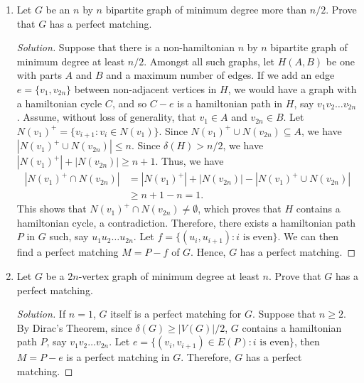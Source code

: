 \documentclass{article}
\newenvironment{problem}[2][Question]{\begin{trivlist}
\item[\hskip \labelsep {\bfseries #1}\hskip \labelsep {\bfseries #2.}]}{\end{trivlist}}
\begin{document}
\begin{problem}{3.8.8}
    
\end{problem}
\begin{enumerate}[label=(\alph*)]
    \item Let $G$ be an $n$ by $n$ bipartite graph of minimum degree more than $n/2$. Prove that $G$ has a perfect matching.
    \begin{proof}[Solution]
        Suppose that there is a non-hamiltonian $n$ by $n$ bipartite graph of minimum degree at least $n /2$. Amongst all such graphs, let $H(A, B)$ be one with parts $A$ and $B$ and a maximum number of edges. If we add an edge $e = \{v_1, v_{2n}\}$ between non-adjacent vertices in $H$, we would have a graph with a hamiltonian cycle $C$, and so $C - e$ is a hamiltonian path in $H$, say $v_1v_2 \dots v_{2n}$. Assume, without loss of generality, that $v_1 \in A$ and $v_{2n} \in B$. Let $N(v_1)^+ = \{v_{i+1} : v_i \in N(v_1)\}$. Since $N(v_1)^+ \cup N(v_{2n}) \subseteq A$, we have $|N(v_1)^+ \cup N(v_{2n})| \leq n$. Since $\delta(H) > n/2$, we have $|N(v_1)^+| + |N(v_{2n})| \geq n + 1$. Thus, we have
        \begin{align}
            |N(v_1)^+ \cap N(v_{2n})| 
            &= |N(v_1)^+| + |N(v_{2n})| - |N(v_1)^+ \cup N(v_{2n})| \\
            &\geq n + 1 - n = 1.
        \end{align}
        This shows that $N(v_1)^+ \cap N(v_{2n}) \neq \emptyset$, which proves that $H$ contains a hamiltonian cycle, a contradiction. Therefore, there exists a hamiltonian path $P$ in $G$ such, say $u_1 u_2 \dots u_{2n}$. Let $f = \{(u_i, u_{i+1}) : i \text{ is even}\}$. We can then find a perfect matching $M = P - f$ of $G$. Hence, $G$ has a perfect matching.
    \end{proof}
    
    \item Let $G$ be a $2n$-vertex graph of minimum degree at least $n$. Prove that $G$ has a perfect matching.

    \begin{proof}[Solution]
        If $n = 1$, $G$ itself is a perfect matching for $G$. Suppose that $n \geq 2$. By Dirac's Theorem, since $\delta(G) \geq |V(G)|/2$, $G$ contains a hamiltonian path $P$, say $v_1v_2 \dots v_{2n}$. Let $e = \{(v_i, v_{i+1}) \in E(P) : i \text{ is even}\}$, then $M = P - e$ is a perfect matching in $G$. Therefore, $G$ has a perfect matching.
    \end{proof}
\end{enumerate}
\end{document}
